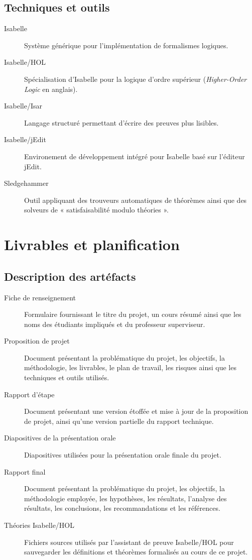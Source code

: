 \documentclass[a4paper, oneside, 12pt, titlepage]{article}
\begin{document}
\subsection{Techniques et outils}

\begin{description}
  \item[Isabelle] Système générique pour l'implémentation de formalismes logiques.
  \item[Isabelle/HOL] Spécialisation d'Isabelle pour la logique d'ordre supérieur
    (\emph{Higher-Order Logic} en anglais).
  \item[Isabelle/Isar] Langage structuré permettant d'écrire des preuves plus lisibles.
  \item[Isabelle/jEdit] Environement de développement intégré pour Isabelle basé sur l'éditeur
    jEdit.
  \item[Sledgehammer] Outil appliquant des trouveurs automatiques de théorèmes ainsi que des
    solveurs de « satisfaisabilité modulo théories ».
\end{description}

\section{Livrables et planification}

\subsection{Description des artéfacts}


\begin{description}
  \item[Fiche de renseignement]
    Formulaire fournissant le titre du projet, un cours résumé ainsi que les noms des étudiants
    impliqués et du professeur superviseur.
  \item[Proposition de projet]
    Document présentant la problématique du projet, les objectifs, la méthodologie, les livrables,
    le plan de travail, les risques ainsi que les techniques et outils utilisés.
  \item[Rapport d'étape]
    Document présentant une version étoffée et mise à jour de la proposition de projet, ainsi qu'une
    version partielle du rapport technique.
  \item[Diapositives de la présentation orale]
    Diapositives utilisées pour la présentation orale finale du projet.
  \item[Rapport final]
    Document présentant la problématique du projet, les objectifs, la méthodologie employée, les
    hypothèses, les résultats, l'analyse des résultats, les conclusions, les recommandations et les
    références.
  \item[Théories Isabelle/HOL]
    Fichiers sources utilisés par l'assistant de preuve Isabelle/HOL pour sauvegarder les
    définitions et théorèmes formalisés au cours de ce projet.
\end{description}
\end{document}
